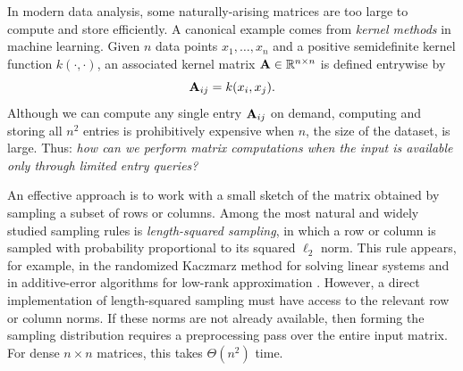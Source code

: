 In modern data analysis, some naturally-arising matrices are too large to compute and store efficiently. A canonical example comes from \emph{kernel methods} in machine learning. Given $n$ data points $x_1,\dots,x_n$ and a positive semidefinite kernel function $k(\cdot,\cdot)$, an associated kernel matrix $\mathbf{A} \in \mathbb{R}^{n\times n}$ is defined entrywise by
\[
\mathbf{A}_{ij} = k(x_i,x_j).
\]
Although we can compute any single entry $\mathbf{A}_{ij}$ on demand, computing and storing all $n^2$ entries is prohibitively expensive when $n$, the size of the dataset, is large. Thus: \textit{how can we perform matrix computations when the input is available only through limited entry queries?} 


An effective approach is to work with a small sketch of the matrix obtained by sampling a subset of rows or columns. Among the most natural and widely studied sampling rules is \emph{length-squared sampling}, in which a row or column is sampled with probability proportional to its squared $\ell_2$ norm. This rule appears, for example, in the randomized Kaczmarz method for solving linear systems \cite{needell_stochastic_2015} and in additive-error algorithms for low-rank approximation \cite{frieze_fast_2004}. However, a direct implementation of length-squared sampling must have access to the relevant row or column norms. If these norms are not already available, then forming the sampling distribution requires a preprocessing pass over the entire input matrix. For dense $n\times n$ matrices, this takes $\Theta(n^2)$ time.




